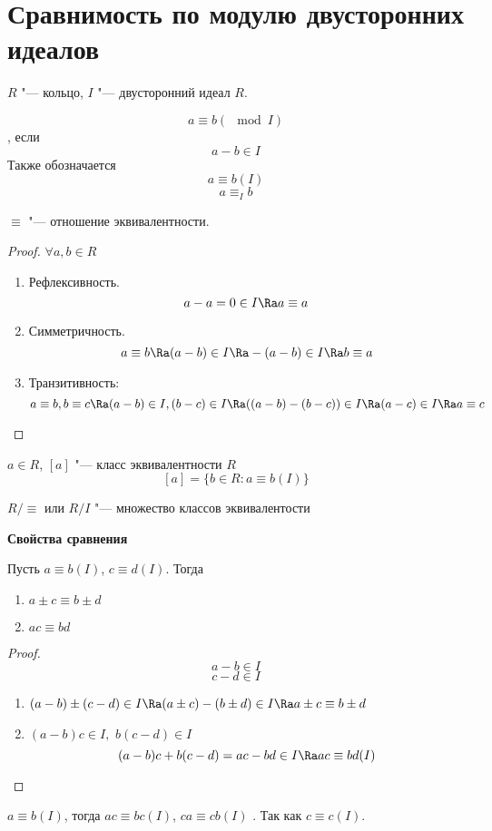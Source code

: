 ﻿\section{Сравнимость по модулю двусторонних идеалов}

\begin{Def}
$R$ "--- кольцо,	
$I$ "--- двусторонний идеал $R$.

\[a \equiv b (\mod I)\], если
\[a - b \in I\]
Также обозначается
\[a \equiv b (I)\]
\[a \equiv_I b\]
\end{Def}

\begin{Rem}
	$\equiv$ "--- отношение эквивалентности.
\end{Rem}
	
\begin{proof}
	$ \forall a, b \in R$
	\begin{enumerate}
		\item Рефлексивность.
			\[a - a = 0 \in I \Ra a \equiv a\]
		\item Симметричность. 
			\[a \equiv b \Ra (a - b) \in I \Ra -(a - b) \in I \Ra b \equiv a\]
		\item Транзитивность: 
			\[a \equiv b, b \equiv c \Ra (a - b) \in I, (b - c) \in I 
			\Ra ((a - b) - (b - c)) \in I \Ra (a - c) \in I \Ra a \equiv c\]
	\end{enumerate}
\end{proof}

\begin{Def}
	$a \in R$,
	$[a]$ "--- класс эквивалентности $R$
	\[ [a] = \{b \in R \colon a \equiv b (I) \} \]
	\begin{center}
		$R/ \equiv$ или $R/I$ "--- множество классов эквивалентости
	\end{center}
\end{Def}

\textbf{Свойства сравнения}

Пусть $a \equiv b (I)$, $c \equiv d (I)$. Тогда
\begin{enumerate}
	\item $a \pm c \equiv b \pm d$
	\item $ac \equiv bd$
\end{enumerate}
	
\begin{proof}
	\[a - b \in I\]
	\[c - d \in I\]
	\begin{enumerate}
		\item $(a - b) \pm (c - d) \in I \Ra
			(a \pm c) - (b \pm d) \in I \Ra a \pm c \equiv b \pm d$
		\item $(a - b) c \in I,$
		$b (c - d) \in I$
		\[(a - b) c + b (c - d) = ac - bd \in I \Ra ac \equiv bd (I)\]
	\end{enumerate}
\end{proof}
	
\begin{conseq}	
	$a \equiv b (I)$, тогда
	$ac \equiv bc (I)$, $ca \equiv cb (I)$	.
	Так как $c \equiv c (I)$.
\end{conseq}